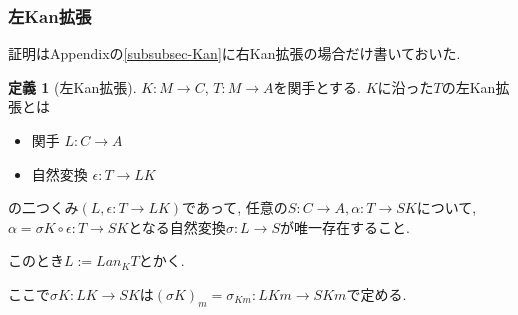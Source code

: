 \documentclass[dvipdfmx,a4paper,11pt]{article}
\theoremstyle{definition}
\newtheorem{dfn}[thm]{定義}
\newtheorem{exa}[thm]{例}
\begin{document}
\begin{comment}


\begin{exa}
$\mathcal{E}={\bf 1}$とする.
$b \in Ob(\mathcal{C})$は
$b :  {\bf 1} \to \mathcal{C}$という関手とみれる. 
$S : \mathcal{D} \to \mathcal{C}$関手として
コンマ圏$(b \downarrow S)$は次のようになる. 
\begin{itemize}
\item Object $(1,d,f) \in Ob(\mathcal{E}) \times Ob(\mathcal{D}) \times Hom_{\mathcal{C}}(b, Sd)$ , つまり$f : b \to Sd$とする. 
\item Morphism $(1,h) : (1,d,f)  \to (1,d',f') \in Hom_{\mathcal{E}}(e,e') \times Hom_{\mathcal{D}}(d,d') $ を $1 : 1 \to 1, h: d \to d'$で$f' = f' \circ id_b = Sh \circ f$となるもの
\end{itemize}

\begin{equation*}
\xymatrix@C=25pt@R=20pt{
1 \ar@{->}[d] _{1}&b\ar@{=}[d]_{id_b}  \ar@{->}[r]^{f} & Sd\ar@{->}[d]^{Sh} &d\ar@{->}[d]_{h}\\
1&b\ar@{->}[r]_{f'} &Sd'&d' \\   
}
\end{equation*}

紛らわしいので１を消すと
\begin{itemize}
\item Object $(d,f) \in \times Ob(\mathcal{D}) \times Hom_{\mathcal{C}}(b, Sd)$ , つまり$f : b \to Sd$とする. 
\item Morphism $h : (d,f)  \to (d',f') \in Hom_{\mathcal{D}}(d,d') $ を 
$h: d \to d'$で$f'  = Sh \circ f$となるもの
\end{itemize}

\end{exa}
\end{comment}


\subsubsection{左Kan拡張}
証明はAppendixの\ref{subsubsec-Kan}に右Kan拡張の場合だけ書いておいた. 

 \begin{tcolorbox}
 [colback = white, colframe = green!35!black, fonttitle = \bfseries,breakable = true]
\begin{dfn}[左Kan拡張]
$K : M \to C$, $T : M \to A$を関手とする.
$K$に沿った$T$の左Kan拡張とは
\begin{itemize}
\item 関手 $L : C \to A$
\item 自然変換 $\epsilon :  T \to LK$
\end{itemize}
の二つくみ$(L, \epsilon :  T \to LK)$であって, 
任意の$S : C \to A, \alpha :  T \to SK $について, $\alpha = \sigma K \circ \epsilon:  T \to SK$となる自然変換$\sigma : L \to S$が唯一存在すること. 

このとき$L := Lan_{K}T$とかく. 
\end{dfn}
\end{tcolorbox}
ここで$\sigma K : LK\to SK$は$(\sigma K)_{m}=\sigma_{Km} : LKm \to SKm$で定める. 
\end{document}

